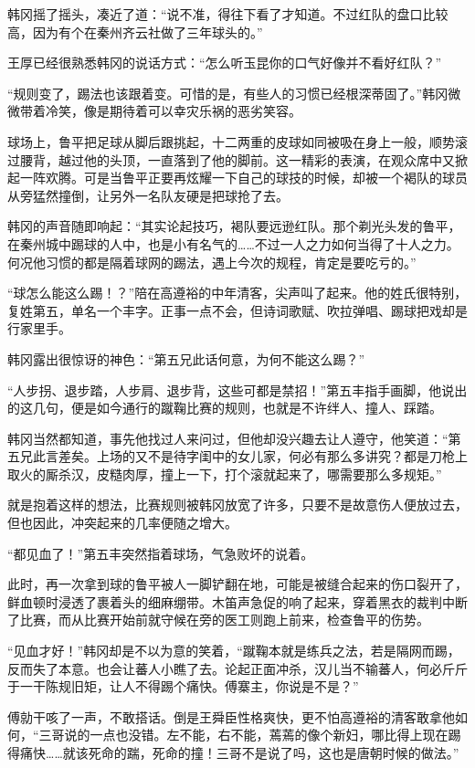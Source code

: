 韩冈摇了摇头，凑近了道：“说不准，得往下看了才知道。不过红队的盘口比较高，因为有个在秦州齐云社做了三年球头的。”

王厚已经很熟悉韩冈的说话方式：“怎么听玉昆你的口气好像并不看好红队？”

“规则变了，踢法也该跟着变。可惜的是，有些人的习惯已经根深蒂固了。”韩冈微微带着冷笑，像是期待着可以幸灾乐祸的恶劣笑容。

球场上，鲁平把足球从脚后跟挑起，十二两重的皮球如同被吸在身上一般，顺势滚过腰背，越过他的头顶，一直落到了他的脚前。这一精彩的表演，在观众席中又掀起一阵欢腾。可是当鲁平正要再炫耀一下自己的球技的时候，却被一个褐队的球员从旁猛然撞倒，让另外一名队友硬是把球抢了去。

韩冈的声音随即响起：“其实论起技巧，褐队要远逊红队。那个剃光头发的鲁平，在秦州城中踢球的人中，也是小有名气的……不过一人之力如何当得了十人之力。何况他习惯的都是隔着球网的踢法，遇上今次的规程，肯定是要吃亏的。”

“球怎么能这么踢！？”陪在高遵裕的中年清客，尖声叫了起来。他的姓氏很特别，复姓第五，单名一个丰字。正事一点不会，但诗词歌赋、吹拉弹唱、踢球把戏却是行家里手。

韩冈露出很惊讶的神色：“第五兄此话何意，为何不能这么踢？”

“人步拐、退步踏，人步肩、退步背，这些可都是禁招！”第五丰指手画脚，他说出的这几句，便是如今通行的蹴鞠比赛的规则，也就是不许绊人、撞人、踩踏。

韩冈当然都知道，事先他找过人来问过，但他却没兴趣去让人遵守，他笑道：“第五兄此言差矣。上场的又不是待字闺中的女儿家，何必有那么多讲究？都是刀枪上取火的厮杀汉，皮糙肉厚，撞上一下，打个滚就起来了，哪需要那么多规矩。”

就是抱着这样的想法，比赛规则被韩冈放宽了许多，只要不是故意伤人便放过去，但也因此，冲突起来的几率便随之增大。

“都见血了！”第五丰突然指着球场，气急败坏的说着。

此时，再一次拿到球的鲁平被人一脚铲翻在地，可能是被缝合起来的伤口裂开了，鲜血顿时浸透了裹着头的细麻绷带。木笛声急促的响了起来，穿着黑衣的裁判中断了比赛，而从比赛开始前就守候在旁的医工则跑上前来，检查鲁平的伤势。

“见血才好！”韩冈却是不以为意的笑着，“蹴鞠本就是练兵之法，若是隔网而踢，反而失了本意。也会让蕃人小瞧了去。论起正面冲杀，汉儿当不输蕃人，何必斤斤于一干陈规旧矩，让人不得踢个痛快。傅寨主，你说是不是？”

傅勍干咳了一声，不敢搭话。倒是王舜臣性格爽快，更不怕高遵裕的清客敢拿他如何，“三哥说的一点也没错。左不能，右不能，蔫蔫的像个新妇，哪比得上现在踢得痛快……就该死命的踹，死命的撞！三哥不是说了吗，这也是唐朝时候的做法。”

